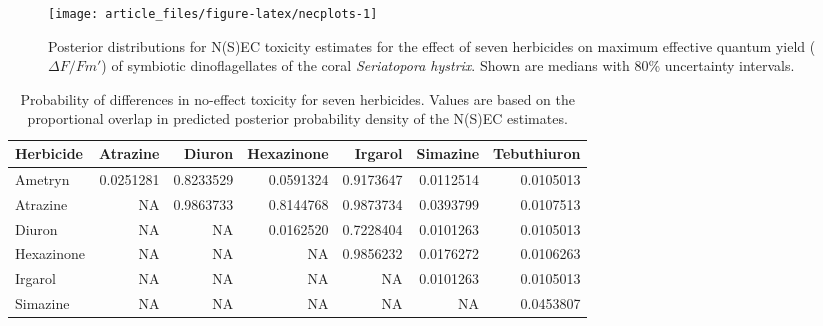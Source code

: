 \documentclass[
  shortnames]{jss}
\begin{document}
\begin{CodeChunk}
\end{CodeChunk}

\begin{CodeChunk}
\begin{figure}[!ht]

{\centering \texttt{[image: article\_files/figure-latex/necplots-1]} 

}

\caption[Posterior distributions for N(S)EC toxicity estimates for the effect of seven herbicides on maximum effective quantum yield ($\Delta F / Fm'$) of symbiotic dinoflagellates of the coral \textit{Seriatopora hystrix}]{Posterior distributions for N(S)EC toxicity estimates for the effect of seven herbicides on maximum effective quantum yield ($\Delta F / Fm'$) of symbiotic dinoflagellates of the coral \textit{Seriatopora hystrix}. Shown are medians with 80\%  uncertainty intervals.}\label{fig:necplots}
\end{figure}
\end{CodeChunk}

\begin{CodeChunk}
\begin{table}

\caption{\label{tab:probdiffs}Probability of differences in no-effect toxicity for seven herbicides. Values are based on the proportional overlap in predicted posterior probability density of the N(S)EC estimates.}
\centering
\begin{tabular}[t]{l|r|r|r|r|r|r}
\hline
Herbicide & Atrazine & Diuron & Hexazinone & Irgarol & Simazine & Tebuthiuron\\
\hline
Ametryn & 0.0251281 & 0.8233529 & 0.0591324 & 0.9173647 & 0.0112514 & 0.0105013\\
\hline
Atrazine & NA & 0.9863733 & 0.8144768 & 0.9873734 & 0.0393799 & 0.0107513\\
\hline
Diuron & NA & NA & 0.0162520 & 0.7228404 & 0.0101263 & 0.0105013\\
\hline
Hexazinone & NA & NA & NA & 0.9856232 & 0.0176272 & 0.0106263\\
\hline
Irgarol & NA & NA & NA & NA & 0.0101263 & 0.0105013\\
\hline
Simazine & NA & NA & NA & NA & NA & 0.0453807\\
\hline
\end{tabular}
\end{table}

\end{CodeChunk}
\end{document}
